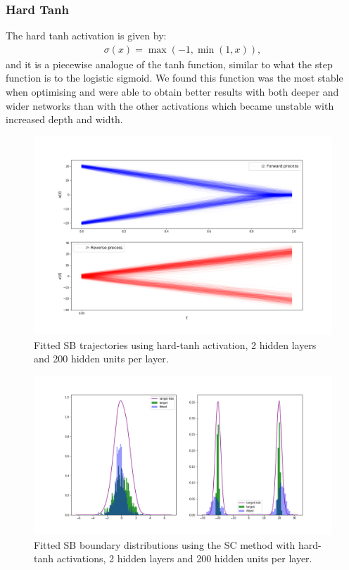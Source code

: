 \documentclass[a4paper,12pt,twoside,openright]{report}
\theoremstyle{definition}
\begin{document}
\subsubsection{Hard Tanh}

The hard tanh activation is given by:
\begin{align*}
    \sigma(x) = \max(-1, \min(1, x)),
\end{align*}
and it is a piecewise analogue of the tanh function, similar to what the step function is to the logistic sigmoid. We found this function was the most stable when optimising and were able to obtain better results with both deeper and wider networks than with the other activations which became unstable with increased depth and width.
\begin{figure}
    \centering
    \includegraphics[scale=0.4,trim={2.3cm 1cm 2.5cm 0}, clip]{images/Control/hard_tanh_200_200__succesfl_bimodal_trajectories.png}
    \caption{ Fitted SB  trajectories using hard-tanh activation, 2 hidden layers and 200 hidden units per layer.}
    \label{fig:trajectoriesbimodtanhnnhard}
\end{figure}
\begin{figure}
    \centering
    \includegraphics[scale=0.4,trim={2.3cm 1cm 2.5cm 0}, clip]{images/Control/hard_tanh_200_200_succesfl_bimodal_boundaires.png}
    \caption{ Fitted SB  boundary distributions using the SC method with hard-tanh activations, 2 hidden layers and 200 hidden units per layer.}
    \label{fig:boundsbimodtanhnnhard}
\end{figure}
\end{document}
